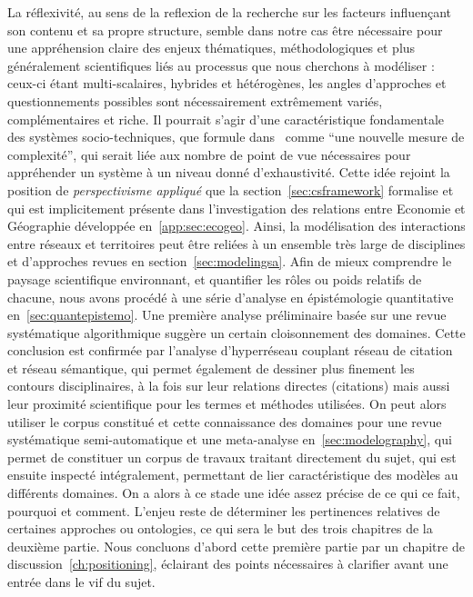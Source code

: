 La réflexivité, au sens de la reflexion de la recherche sur les facteurs influençant son contenu et sa propre structure, semble dans notre cas être nécessaire pour une appréhension claire des enjeux thématiques, méthodologiques et plus généralement scientifiques liés au processus que nous cherchons à modéliser : ceux-ci étant multi-scalaires, hybrides et hétérogènes, les angles d'approches et questionnements possibles sont nécessairement extrêmement variés, complémentaires et riche. Il pourrait s'agir d'une caractéristique fondamentale des systèmes socio-techniques, que  formule dans~\cite{pumain2005cumulativite} comme ``une nouvelle mesure de complexité'', qui serait liée aux nombre de point de vue nécessaires pour appréhender un système à un niveau donné d'exhaustivité. Cette idée rejoint la position de \emph{perspectivisme appliqué} que la section~\ref{sec:csframework} formalise et qui est implicitement présente dans l'investigation des relations entre Economie et Géographie développée en~\ref{app:sec:ecogeo}. Ainsi, la modélisation des interactions entre réseaux et territoires peut être reliées à un ensemble très large de disciplines et d'approches revues en section~\ref{sec:modelingsa}. Afin de mieux comprendre le paysage scientifique environnant, et quantifier les rôles ou poids relatifs de chacune, nous avons procédé à une série d'analyse en épistémologie quantitative en~\ref{sec:quantepistemo}. Une première analyse préliminaire basée sur une revue systématique algorithmique suggère un certain cloisonnement des domaines. Cette conclusion est confirmée par l'analyse d'hyperréseau couplant réseau de citation et réseau sémantique, qui permet également de dessiner plus finement les contours disciplinaires, à la fois sur leur relations directes (citations) mais aussi leur proximité scientifique pour les termes et méthodes utilisées. On peut alors utiliser le corpus constitué et cette connaissance des domaines pour une revue systématique semi-automatique et une meta-analyse en~\ref{sec:modelography}, qui permet de constituer un corpus de travaux traitant directement du sujet, qui est ensuite inspecté intégralement, permettant de lier caractéristique des modèles au différents domaines. On a alors à ce stade une idée assez précise de ce qui ce fait, pourquoi et comment. L'enjeu reste de déterminer les pertinences relatives de certaines approches ou ontologies, ce qui sera le but des trois chapitres de la deuxième partie. Nous concluons d'abord cette première partie par un chapitre de discussion~\ref{ch:positioning}, éclairant des points nécessaires à clarifier avant une entrée dans le vif du sujet.






\stars
